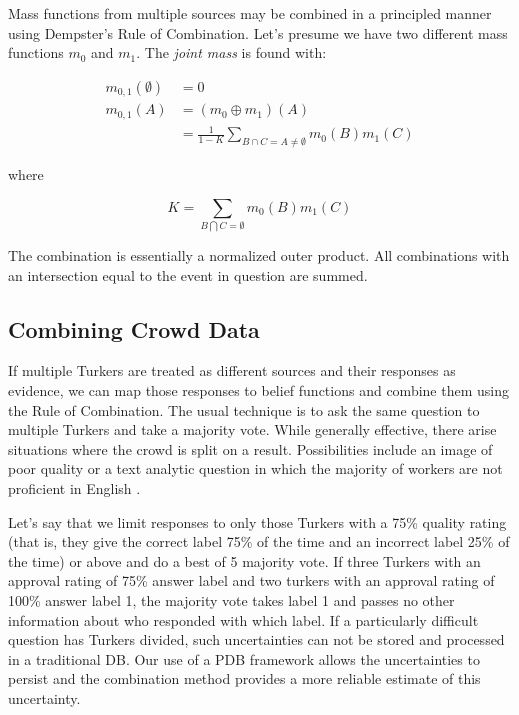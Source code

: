 Mass functions from multiple sources may be combined in a principled manner using Dempster's Rule of Combination.  Let's presume we have two different mass functions $m_{0}$ and $m_{1}$.  The \textit{joint mass} is found with:

\begin{equation*}
\begin{split}
m_{0,1}(\emptyset) &=0\\
m_{0,1}(A) &=(m_{0}\oplus m_{1})(A)\\
                   &=\frac{1}{1-K} \sum_{B\cap C=A\neq\emptyset} m_{0}(B)m_{1}(C)
\end{split}
\end{equation*}

where

\begin{equation*}
K=\sum_{B\bigcap C=\emptyset}m_{0}(B)m_{1}(C)
\end{equation*}

The combination is essentially a normalized outer product.  All combinations with an intersection equal to the event in question are summed.
 
\subsection{Combining Crowd Data}

If multiple Turkers are treated as different sources and their responses as evidence, we can map those responses to belief functions and combine them using the Rule of Combination.  The usual technique is to ask the same question to multiple Turkers and take a majority vote.  While generally effective, there arise situations where the crowd is split on a result.  Possibilities include an image of poor quality or a text analytic question in which the majority of workers are not proficient in English \cite{Rashtchian:2010:CIA:1866696.1866717}.

Let's say that we limit responses to only those Turkers with a 75\% quality rating (that is, they give the correct label 75\% of the time and an incorrect label 25\% of the time) or above and do a best of 5 majority vote.  If three Turkers with an approval rating of 75\% answer label  and two turkers with an approval rating of 100\% answer label 1, the majority vote takes label 1 and passes no other information about who responded with which label.  If a particularly difficult question has Turkers divided, such uncertainties can not be stored and processed in a traditional DB.  Our use of a PDB framework allows the uncertainties to persist and the combination method provides a more reliable estimate of this uncertainty. 

